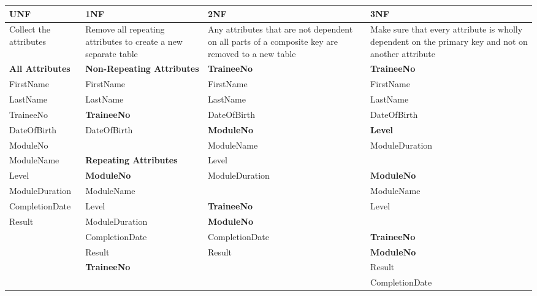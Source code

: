 \documentclass{article}
\begin{document}
\begin{center}
\begin{tabular}{|p{3cm}|p{5cm}|p{3cm}|p{3cm}|} \hline
\textbf{UNF} & \textbf{1NF} & \textbf{2NF} & \textbf{3NF} \\ \hline
Collect the attributes & Remove all repeating attributes to create a new separate table & Any attributes that are not dependent on all parts of a composite key are removed to a new table & Make sure that every attribute is wholly dependent on the primary key and not on another attribute \\ \hline
\textbf{All Attributes} & \textbf{Non-Repeating Attributes} & \textbf{TraineeNo} & \textbf{TraineeNo} \\ 
FirstName & FirstName & FirstName & FirstName \\
LastName & LastName & LastName & LastName \\
TraineeNo & \textbf{TraineeNo} & DateOfBirth & DateOfBirth \\
DateOfBirth & DateOfBirth & \textbf{ModuleNo} & \textbf{Level} \\
ModuleNo & & ModuleName & ModuleDuration \\
ModuleName & \textbf{Repeating Attributes} & Level & \\
Level &\textbf{ModuleNo} & ModuleDuration & \textbf{ModuleNo} \\
ModuleDuration & ModuleName & & ModuleName \\
CompletionDate & Level & \textbf{TraineeNo} & Level \\
Result & ModuleDuration & \textbf{ModuleNo} &  \\
& CompletionDate & CompletionDate & \textbf{TraineeNo} \\
& Result & Result & \textbf{ModuleNo} \\
& \textbf{TraineeNo} & & Result \\
& & & CompletionDate \\ \hline
\end{tabular}
\end{center}
\end{document}
